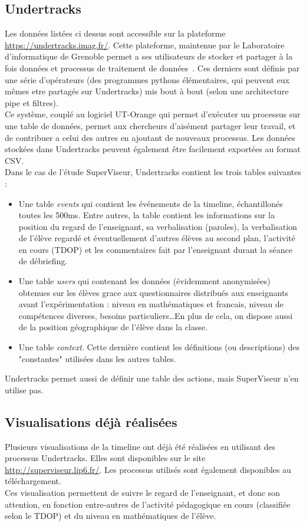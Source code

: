 \documentclass{article}
\begin{document}
\subsection{Undertracks}
Les données listées ci dessus sont accessible sur la plateforme \href{https://undertracks.imag.fr/}{https://undertracks.imag.fr/}.
Cette plateforme, maintenue par le Laboratoire d'informatique de Grenoble permet a ses utilisateurs de stocker et partager à la fois données et processus de traitement de données~\cite{CPDEP}. Ces derniers sont définis par une série d'opérateurs (des programmes pythons élémentaires, qui peuvent eux mêmes etre partagés sur Undertracks) mis bout à bout (selon une architecture pipe et filtres).\\
Ce système, couplé au logiciel UT-Orange qui permet d'exécuter un processus sur une table de données, permet aux chercheurs d'aisément partager leur travail, et de contribuer a celui des autres en ajoutant de nouveaux processus. Les données stockées dans Undertracks peuvent également être facilement exportées au format CSV.\\
Dans le cas de l'étude SuperViseur, Undertracks contient les trois tables suivantes :
\begin{itemize}
  \item Une table \textit{events} qui contient les événements de la timeline, échantillonés toutes les 500ms. Entre autres, la table contient les informations sur la position du regard de l'enseignant, sa verbalisation (paroles), la verbalisation de l'élève regardé et éventuellement d'autres élèves au second plan, l'activité en cours (TDOP) et les commentaires fait par l'enseignant durant la séance de débriefing.
  \item Une table \textit{users} qui contenant les données (évidemment anonymisées) obtenues sur les élèves grace aux questionnaires distribués aux enseignants avant l'expérimentation : niveau en mathématiques et francais, niveau de compétences diverses, besoins particuliers\ldots En plus de cela, on dispose aussi de la position géographique de l'élève dans la classe.
  \item Une table \textit{context}. Cette dernière contient les définitions (ou descriptions) des "constantes" utilisées dans les autres tables.
\end{itemize}
Undertracks permet aussi de définir une table des actions, mais SuperViseur n'en utilise pas.

\subsection{Visualisations déjà réalisées}
Plusieurs visualisations de la timeline ont déjà été réalisées en utilisant des processus Undertracks. Elles sont disponibles sur le site \href{http://superviseur.lip6.fr/}{http://superviseur.lip6.fr/}. Les processus utilisés sont également disponibles au téléchargement.\\
Ces visualisation permettent de suivre le regard de l'enseignant, et donc son attention, en fonction entre-autres de l'activité pédagogique en cours (classifiée selon le TDOP) et du niveau en mathématiques de l'élève.\\
\end{document}
